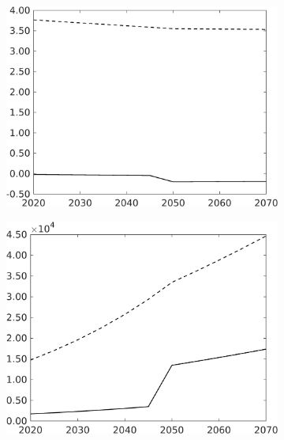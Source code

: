 \begin{figure}[h!!!]
\begin{subfigure}[]{0.32\textwidth}
	\end{subfigure}
	\begin{subfigure}[]{0.32\textwidth}
		\includegraphics[width=1\textwidth]{../../codding_model/own_basedOnFried/optimalPol_010922_revision/figures/all_13Sept22_Tplus30/sn_PercentageLFDyn_Target_regime4_knspil1_spillover0_noskill0_sep0_xgrowth0_PV1_etaa0.79_lgd0.png}
	\end{subfigure}
	\begin{subfigure}[]{0.32\textwidth}
		\includegraphics[width=1\textwidth]{../../codding_model/own_basedOnFried/optimalPol_010922_revision/figures/all_13Sept22_Tplus30/sg_PercentageLFDyn_Target_regime4_knspil1_spillover0_noskill0_sep0_xgrowth0_PV1_etaa0.79_lgd0.png}

\end{subfigure}
\end{figure}
